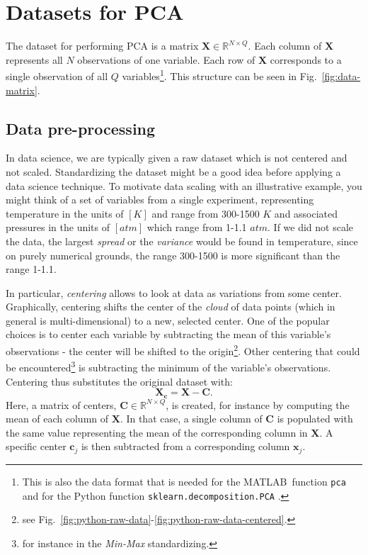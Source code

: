 \documentclass[10pt,twocolumn]{article}
\begin{document}
\section{Datasets for PCA}

The dataset for performing PCA is a matrix $\mathbf{X} \in \mathbb{R}^{N \times Q}$. Each column of $\mathbf{X}$ represents all $N$ observations of one variable. Each row of $\mathbf{X}$ corresponds to a single observation of all $Q$ variables\footnote{This is also the data format that is needed for the MATLAB\textregistered \, function \texttt{pca} \cite{Matlab-pca} and for the Python function \texttt{sklearn.decomposition.PCA} \cite{Python-pca}.}. This structure can be seen in Fig.~\ref{fig:data-matrix}.

\subsection{Data pre-processing}

In data science, we are typically given a raw dataset which is not centered and not scaled. Standardizing the dataset might be a good idea before applying a data science technique. To motivate data scaling with an illustrative example, you might think of a set of variables from a single experiment, representing temperature in the units of $[K]$ and range from 300-1500 $K$ and associated pressures in the units of $[atm]$ which range from 1-1.1 $atm$. If we did not scale the data, the largest \textit{spread} or the \textit{variance} would be found in temperature, since on purely numerical grounds, the range 300-1500 is more significant than the range 1-1.1.

In particular, \textit{centering} allows to look at data as variations from some center. Graphically, centering shifts the center of the \textit{cloud} of data points (which in general is multi-dimensional) to a new, selected center. One of the popular choices is to center each variable by subtracting the mean of this variable's observations - the center will be shifted to the origin\footnote{see Fig.~\ref{fig:python-raw-data}-\ref{fig:python-raw-data-centered}.}.
Other centering that could be encountered\footnote{for instance in the \textit{Min-Max} standardizing.} is subtracting the minimum of the variable's observations. Centering thus substitutes the original dataset with:
\begin{equation}
\mathbf{X_c} = \mathbf{X} - \mathbf{C}.
\end{equation}
Here, a matrix of centers, $\mathbf{C} \in \mathbb{R}^{N \times Q}$, is created, for instance by computing the mean of each column of $\mathbf{X}$. In that case, a single column of $\mathbf{C}$ is populated with the same value representing the mean of the corresponding column in $\mathbf{X}$. A specific center $\mathbf{c}_j$ is then subtracted from a corresponding column $\mathbf{x}_j$.
\end{document}
